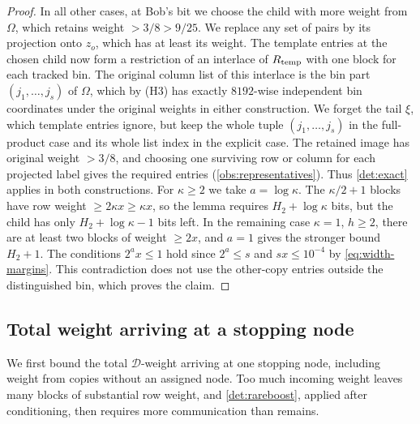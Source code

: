 \documentclass[11pt,letterpaper]{article} \usepackage[utf8]{inputenc}
\theoremstyle{plain} \newtheorem{theorem}{Theorem}[section]
\theoremstyle{definition} \newaliascnt{definition}{theorem}
\begin{document}
\begin{proof}
In all other cases, at Bob's bit we choose the child with more weight from
$\Omega$, which retains weight $>3/8>9/25$. We replace any set of pairs by its
projection onto $z_o$, which has at least its weight. The template entries at
the chosen child now form a restriction of an interlace of $R_{\rm temp}$ with one
block for each tracked bin. The original column list of this interlace is the bin part
$(j_1,\ldots,j_s)$ of $\Omega$, which by (H3) has exactly
$8192$-wise independent bin coordinates under the original weights in either
construction. We forget the tail $\xi$, which template entries ignore, but keep
the whole tuple $(j_1,\ldots,j_s)$ in the
full-product case and its whole list index in the explicit case. The retained
image has original weight $>3/8$, and choosing one surviving row or column
for each projected label gives the required entries (\cref{obs:representatives}). Thus
\cref{det:exact} applies in both constructions. For $\kappa\ge2$ we
take $a=\log\kappa$. The $\kappa/2+1$ blocks have row weight
$\ge2\kappa x\ge\kappa x$, so the lemma requires $H_2+\log\kappa$ bits, but
the child has only $H_2+\log\kappa-1$ bits left. In the remaining case $\kappa=1$, $h\ge2$, there are at least two
blocks of weight $\ge2x$, and $a=1$ gives the stronger bound $H_2+1$.
The conditions $2^ax\le1$ hold since $2^a\le s$ and $sx\le10^{-4}$ by \eqref{eq:width-margins}. This
contradiction does not use the other-copy entries outside the distinguished
bin, which proves the claim.
\end{proof}

\subsection{Total weight arriving at a stopping node}
\label{sec:incoming-bound-proof}

We first bound the total $\mathcal D$-weight arriving at one stopping node,
including weight from copies without an assigned node. Too much incoming
weight leaves many blocks of substantial row weight, and \cref{det:rareboost},
applied after conditioning, then requires more communication than remains.
\end{document}
